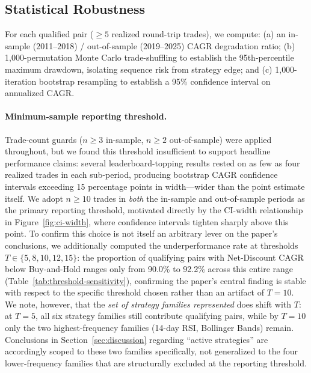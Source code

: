 \documentclass[11pt]{article}
\begin{document}
\subsection{Statistical Robustness}
\label{sec:robustness}

For each qualified pair ($\geq 5$ realized round-trip trades), we compute: (a) an in-sample (2011--2018) / out-of-sample (2019--2025) CAGR degradation ratio; (b) 1{,}000-permutation Monte Carlo trade-shuffling to establish the 95th-percentile maximum drawdown, isolating sequence risk from strategy edge; and (c) 1{,}000-iteration bootstrap resampling to establish a 95\% confidence interval on annualized CAGR.

\paragraph{Minimum-sample reporting threshold.} Trade-count guards ($n \geq 3$ in-sample, $n \geq 2$ out-of-sample) were applied throughout, but we found this threshold insufficient to support headline performance claims: several leaderboard-topping results rested on as few as four realized trades in each sub-period, producing bootstrap CAGR confidence intervals exceeding 15 percentage points in width---wider than the point estimate itself. We adopt $n \geq 10$ trades in \emph{both} the in-sample and out-of-sample periods as the primary reporting threshold, motivated directly by the CI-width relationship in Figure~\ref{fig:ci-width}, where confidence intervals tighten sharply above this point. To confirm this choice is not itself an arbitrary lever on the paper's conclusions, we additionally computed the underperformance rate at thresholds $T \in \{5, 8, 10, 12, 15\}$: the proportion of qualifying pairs with Net-Discount CAGR below Buy-and-Hold ranges only from 90.0\% to 92.2\% across this entire range (Table~\ref{tab:threshold-sensitivity}), confirming the paper's central finding is stable with respect to the specific threshold chosen rather than an artifact of $T=10$. We note, however, that the \emph{set of strategy families represented} does shift with $T$: at $T=5$, all six strategy families still contribute qualifying pairs, while by $T=10$ only the two highest-frequency families (14-day RSI, Bollinger Bands) remain. Conclusions in Section~\ref{sec:discussion} regarding ``active strategies'' are accordingly scoped to these two families specifically, not generalized to the four lower-frequency families that are structurally excluded at the reporting threshold.
\end{document}
